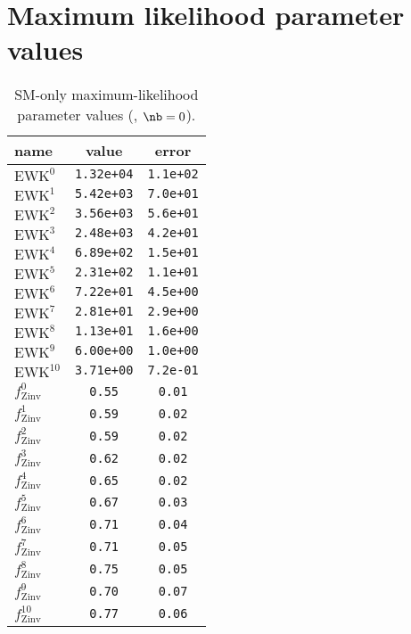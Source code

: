 \clearpage
\section{Maximum likelihood parameter values\label{app:ml-params}}

\begin{table}\centering
\caption{SM-only maximum-likelihood parameter values (\njetlow, $\nb = 0$).}
\label{tab:mlParameterValues0b_le3j}
\begin{tabular}{lcc} name & value & error \\ \hline
$\mathrm{EWK}^{0}$ & {\tt  1.32e+04} & {\tt  1.1e+02}\\
$\mathrm{EWK}^{1}$ & {\tt  5.42e+03} & {\tt  7.0e+01}\\
$\mathrm{EWK}^{2}$ & {\tt  3.56e+03} & {\tt  5.6e+01}\\
$\mathrm{EWK}^{3}$ & {\tt  2.48e+03} & {\tt  4.2e+01}\\
$\mathrm{EWK}^{4}$ & {\tt  6.89e+02} & {\tt  1.5e+01}\\
$\mathrm{EWK}^{5}$ & {\tt  2.31e+02} & {\tt  1.1e+01}\\
$\mathrm{EWK}^{6}$ & {\tt  7.22e+01} & {\tt  4.5e+00}\\
$\mathrm{EWK}^{7}$ & {\tt  2.81e+01} & {\tt  2.9e+00}\\
$\mathrm{EWK}^{8}$ & {\tt  1.13e+01} & {\tt  1.6e+00}\\
$\mathrm{EWK}^{9}$ & {\tt  6.00e+00} & {\tt  1.0e+00}\\
$\mathrm{EWK}^{10}$ & {\tt  3.71e+00} & {\tt  7.2e-01}\\
$f_\mathrm{Zinv}^{0}$ & {\tt 0.55} & {\tt 0.01}\\
$f_\mathrm{Zinv}^{1}$ & {\tt 0.59} & {\tt 0.02}\\
$f_\mathrm{Zinv}^{2}$ & {\tt 0.59} & {\tt 0.02}\\
$f_\mathrm{Zinv}^{3}$ & {\tt 0.62} & {\tt 0.02}\\
$f_\mathrm{Zinv}^{4}$ & {\tt 0.65} & {\tt 0.02}\\
$f_\mathrm{Zinv}^{5}$ & {\tt 0.67} & {\tt 0.03}\\
$f_\mathrm{Zinv}^{6}$ & {\tt 0.71} & {\tt 0.04}\\
$f_\mathrm{Zinv}^{7}$ & {\tt 0.71} & {\tt 0.05}\\
$f_\mathrm{Zinv}^{8}$ & {\tt 0.75} & {\tt 0.05}\\
$f_\mathrm{Zinv}^{9}$ & {\tt 0.70} & {\tt 0.07}\\
$f_\mathrm{Zinv}^{10}$ & {\tt 0.77} & {\tt 0.06}\\

\end{tabular}
\end{table}
